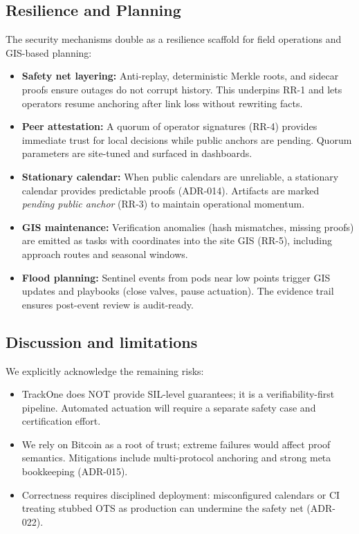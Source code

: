 \subsection{Resilience and Planning}
The security mechanisms double as a resilience scaffold for field operations and \ac{GIS}-based planning:
\begin{itemize}[nosep]
  \item \textbf{Safety net layering:} Anti-replay, deterministic Merkle roots, and sidecar proofs ensure outages do not corrupt history.
  This underpins RR-1 and lets operators resume anchoring after link loss without rewriting facts.
  \item \textbf{Peer attestation:} A quorum of operator signatures (RR-4) provides immediate trust for local decisions while public anchors are pending.
  Quorum parameters are site-tuned and surfaced in dashboards.
  \item \textbf{Stationary calendar:} When public calendars are unreliable, a stationary calendar provides predictable proofs (\ac{ADR}-014).
  Artifacts are marked \emph{pending public anchor} (RR-3) to maintain operational momentum.
  \item \textbf{GIS maintenance:} Verification anomalies (hash mismatches, missing proofs) are emitted as tasks with coordinates into the site \ac{GIS} (RR-5), including approach routes and seasonal windows.
  \item \textbf{Flood planning:} Sentinel events from pods near low points trigger \ac{GIS} updates and playbooks (close valves, pause actuation).
  The evidence trail ensures post-event review is audit-ready.
\end{itemize}

\subsection{Discussion and limitations}
We explicitly acknowledge the remaining risks:
\begin{itemize}[nosep]
  \item TrackOne does NOT provide \ac{SIL}-level guarantees; it is a verifiability-first pipeline.
  Automated actuation will require a separate safety case and certification effort.
  \item We rely on Bitcoin as a root of trust; extreme failures would affect proof semantics.
  Mitigations include multi-protocol anchoring and strong meta bookkeeping (\ac{ADR}-015).
  \item Correctness requires disciplined deployment: misconfigured calendars or \ac{CI} treating stubbed \ac{OTS} as production can undermine the safety net (\ac{ADR}-022).
\end{itemize}
